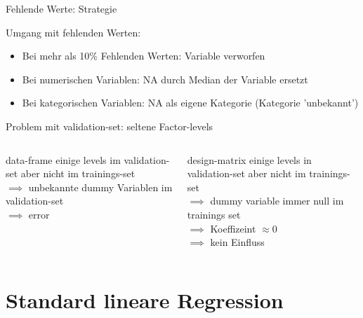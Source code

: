 \documentclass[10pt]{beamer}
\begin{document}
\begin{frame}{Fehlende Werte: Strategie}
	
	\begin{Large}{Umgang mit fehlenden Werten:}\end{Large}
	\begin{itemize}
		\item Bei mehr als 10\% Fehlenden Werten: Variable verworfen
		\item Bei numerischen Variablen: NA durch Median der Variable ersetzt
		\item Bei kategorischen Variablen: NA als eigene Kategorie (Kategorie 'unbekannt')
	\end{itemize}
	
\end{frame}

\begin{frame}{Problem mit validation-set: seltene Factor-levels}
	\begin{columns}[T,onlytextwidth]
		
		
		\begin{block}{data-frame}
			einige levels im validation-set aber nicht im trainings-set\\
			$\implies$ unbekannte dummy Variablen im validation-set\\
			$\implies$ error
		\end{block}
		
		
		\begin{block}{design-matrix}
			einige levels in validation-set aber nicht im trainings-set\\
			$\implies$ dummy variable immer null im trainings set\\
			$\implies$ Koeffizeint $\approx 0$\\
			$\implies$ kein Einfluss
		\end{block}
		
	\end{columns}
\end{frame}


\section{Standard lineare Regression}
\end{document}
